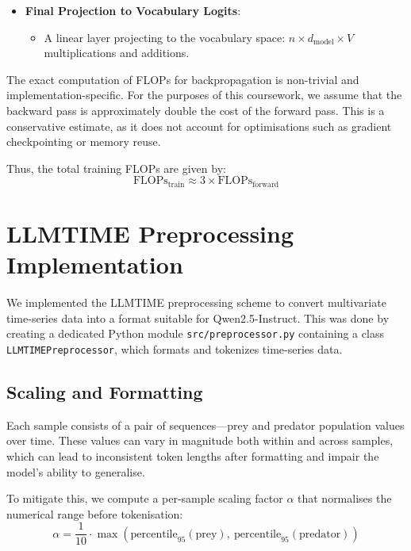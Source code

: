 \documentclass[a4paper,12pt]{article}
\begin{document}
\begin{itemize}
  \item \textbf{Final Projection to Vocabulary Logits}:
  \begin{itemize}
    \item A linear layer projecting to the vocabulary space: $n \times d_{\text{model}} \times V$ multiplications and additions.
  \end{itemize}
\end{itemize}

The exact computation of FLOPs for backpropagation is non-trivial and implementation-specific. For the purposes of this coursework, we assume that the backward pass is approximately double the cost of the forward pass. This is a conservative estimate, as it does not account for optimisations such as gradient checkpointing or memory reuse.

Thus, the total training FLOPs are given by:
\begin{equation}
\text{FLOPs}_{\text{train}} \approx 3 \times \text{FLOPs}_{\text{forward}}
\end{equation}

\section{LLMTIME Preprocessing Implementation}

We implemented the LLMTIME preprocessing scheme \citep{gruver2023language} to convert multivariate time-series data into a format suitable for Qwen2.5-Instruct. This was done by creating a dedicated Python module \texttt{src/preprocessor.py} containing a class \texttt{LLMTIMEPreprocessor}, which formats and tokenizes time-series data.

\subsection*{Scaling and Formatting}

Each sample consists of a pair of sequences—prey and predator population values over time. These values can vary in magnitude both within and across samples, which can lead to inconsistent token lengths after formatting and impair the model’s ability to generalise.

To mitigate this, we compute a per-sample scaling factor $\alpha$ that normalises the numerical range before tokenisation:
\begin{equation}
\alpha = \frac{1}{10} \cdot \max\left(\text{percentile}_{95}(\text{prey}),\ \text{percentile}_{95}(\text{predator})\right)
\end{equation}
\end{document}
